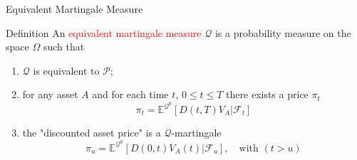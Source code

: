 \documentclass{beamer}
\begin{document}

\begin{frame}{Equivalent Martingale Measure}
	\begin{block}{Definition}
		An \textcolor{red}{equivalent martingale measure} $\mathcal{Q}$ is a probability measure on the space $\Omega$ such that
		\begin{enumerate}
			\item $\mathcal{Q}$ is equivalent to $\mathcal{P}$;
			\item for any asset $A$ and for each time $t$, $0\le t\le T$ there exists a price $\pi_t$
			\begin{equation*}
				\pi_t = \mathbb{E}^{\mathcal{Q}^0}[D(t,T)V_A|\mathcal{F}_t]
			\end{equation*}
			\item the "discounted asset price" is a $\mathcal{Q}$-martingale
			\begin{equation*}
				\pi_u = \mathbb{E}^{\mathcal{Q}^0}[D(0,t)V_A(t)|\mathcal{F}_u], \quad\text{with }(t>u)
			\end{equation*}
		\end{enumerate}
	\end{block}
\end{frame}
\end{document}

